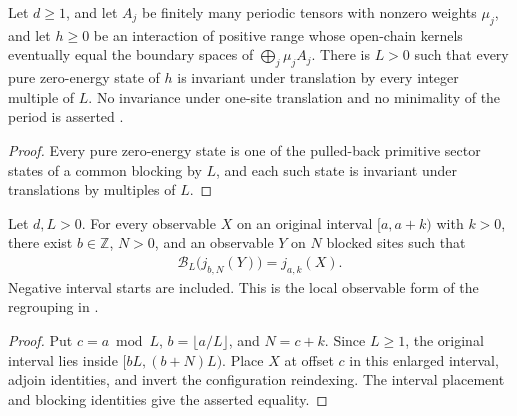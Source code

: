 \begin{lemma}
    \label{thm:periodic_family_pure_ground_state_period}
    \leanok
    Let $d\geq1$, and let $A_j$ be finitely many periodic tensors with nonzero weights $\mu_j$,
    and let $h\geq0$ be an interaction of positive range whose open-chain
    kernels eventually equal the boundary spaces of
    $\bigoplus_j\mu_jA_j$. There is $L>0$ such that every pure zero-energy
    state of $h$ is invariant under translation by every integer multiple
    of $L$. No invariance under one-site translation and no minimality of
    the period is asserted \cite[Theorem~1.1]{Nachtergaele1996Spectral}.
\end{lemma}
\begin{proof}\leanok
    Every pure zero-energy state is one of the pulled-back primitive sector
    states of a common blocking by $L$, and each such state is invariant
    under translations by multiples of $L$.
\end{proof}

\begin{lemma}
    \label{thm:original_local_observable_blocked_interval}
    \leanok
    Let $d,L>0$. For every observable $X$ on an original interval
    $[a,a+k)$ with $k>0$, there exist $b\in\mathbb Z$, $N>0$, and an
    observable $Y$ on $N$ blocked sites such that
    \begin{align}
        \mathcal B_L\bigl(j_{b,N}(Y)\bigr)=j_{a,k}(X).
    \end{align}
    Negative interval starts are included. This is the local observable
    form of the regrouping in
    \cite[lines~825--836 and Section~3]{Nachtergaele1996Spectral}.
\end{lemma}
\begin{proof}\leanok
    Put $c=a\bmod L$, $b=\lfloor a/L\rfloor$, and $N=c+k$.
    Since $L\geq1$, the original interval lies inside $[bL,(b+N)L)$.
    Place $X$ at offset $c$ in this enlarged interval, adjoin identities,
    and invert the configuration reindexing. The interval placement and
    blocking identities give the asserted equality.
\end{proof}

